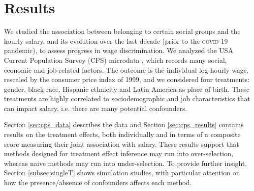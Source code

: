 \documentclass[12pt]{article}
\begin{document}
\section{Results} \label{sec:cps}

We studied the association between belonging to certain social groups and the hourly salary, and its evolution over the last decade (prior to the \textsc{covid}-19 pandemic), to assess progress in wage discrimination. We analyzed the USA Current Population Survey (CPS) microdata \citep{ipums}, which records many social, economic and job-related factors. %
The outcome is the individual log-hourly wage, rescaled by the consumer price index of 1999, and we considered four treatments: gender, black race, Hispanic ethnicity and Latin America as place of birth. These treatments are highly correlated to sociodemographic and job characteristics that can impact salary, i.e. there are many potential confounders.

Section \ref{sec:cps_data} describes the data and Section \ref{sec:cps_results} contains results on the treatment effects, both individually and in terms of a composite score measuring their joint association with salary.
These results support that methods designed for treatment effect inference may run into over-selection, whereas naive methods may run into under-selection.
To provide further insight, Section \ref{subsec:singleT} shows simulation studies, with particular attention on how the presence/absence of confounders affects each method.
\end{document}
